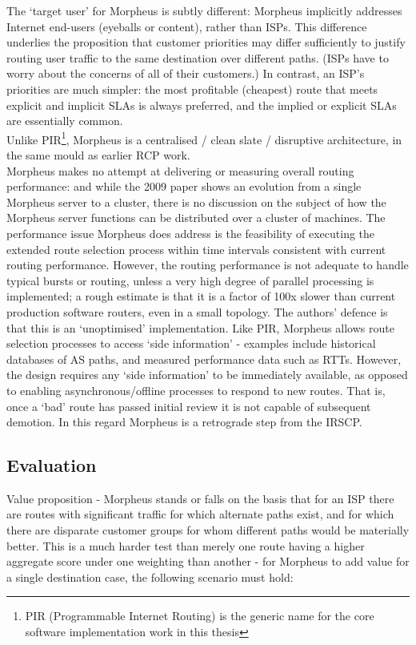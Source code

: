 The ‘target user’ for Morpheus is subtly different: Morpheus implicitly addresses Internet end-users (eyeballs or content), rather than ISPs. This difference underlies the proposition that customer priorities may differ sufficiently to justify routing user traffic to the same destination over different paths. (ISPs have to worry about the concerns of all of their customers.)
In contrast, an ISP's priorities are much simpler: the most profitable (cheapest) route that meets explicit and implicit SLAs is always preferred, and the implied or explicit SLAs are essentially common.
\\
Unlike PIR\footnote{PIR (Programmable Internet Routing) is the generic name for the core software implementation work in this thesis}, Morpheus is a centralised / clean slate / disruptive architecture, in the same mould as earlier RCP work. 
\\
Morpheus makes no attempt at delivering or measuring overall routing performance: and while the 2009 paper shows an evolution from a single Morpheus server to a cluster, there is no discussion on the subject of how the Morpheus server functions can be distributed over a cluster of machines.
The performance issue Morpheus does address is the feasibility of executing the extended route selection process within time intervals consistent with current routing performance. However, the routing performance is not adequate to handle typical bursts or routing, unless a very high degree of parallel processing is implemented; a rough estimate is that it is a factor of 100x slower than current production software routers, even in a small topology.
The authors' defence is that this is an `unoptimised’ implementation.
Like PIR, Morpheus allows route selection processes to access ‘side information’ - examples include historical databases of AS paths, and measured performance data such as RTTs. However, the design requires any ‘side information’ to be immediately available, as opposed to enabling asynchronous/offline processes to respond to new routes.
That is, once a ‘bad’ route has passed initial review it is not capable of subsequent demotion.
In this regard Morpheus is a retrograde step from the IRSCP.


\subsection{Evaluation}
Value proposition - Morpheus stands or falls on the basis that for an ISP there are routes with significant traffic for which alternate paths exist, and for which there are disparate customer groups for whom different paths would be materially better.
This is a much harder test than merely one route having a higher aggregate score under one weighting than another - for Morpheus to add value for a single destination case, the following scenario must hold:

